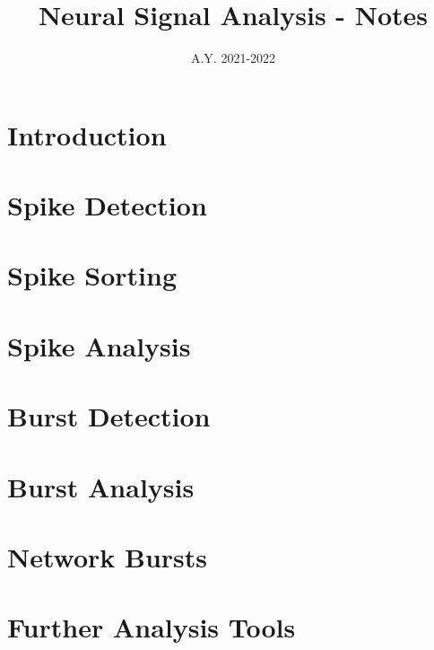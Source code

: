 \documentclass[12pt]{article}
\title{Neural Signal Analysis - Notes}
\date{A.Y. 2021-2022}
\begin{document}
\maketitle

\tableofcontents
\newpage

\section{Introduction}
\graphicspath{ {./images/1/} }

\newpage

\section{Spike Detection}
\graphicspath{ {./images/2/} }

\newpage

\section{Spike Sorting}
\graphicspath{ {./images/3/} }

\newpage

\section{Spike Analysis}
\graphicspath{ {./images/4/} }

\newpage

\section{Burst Detection}
\graphicspath{ {./images/5/} }

\newpage

\section{Burst Analysis}
\graphicspath{ {./images/6/} }

\newpage

\section{Network Bursts}
\graphicspath{ {./images/7/} }

\newpage

\section{Further Analysis Tools}
\graphicspath{ {./images/8/} }

\newpage
\end{document}
